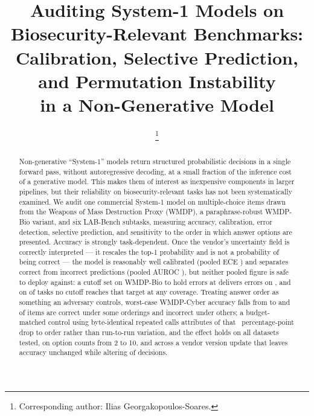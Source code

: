 \documentclass[conference,compsoc]{IEEEtran}
\begin{document}
\title{Auditing System-1 Models on Biosecurity-Relevant Benchmarks:\\
Calibration, Selective Prediction, and Permutation Instability\\
in a Non-Generative Model}

\author{%
\thanks{Corresponding author: Ilias Georgakopoulos-Soares.}
}

\maketitle

\begin{abstract}
Non-generative ``System-1'' models return structured probabilistic decisions in a single
forward pass, without autoregressive decoding, at a small fraction of the inference cost of
a generative model. This makes them of interest as inexpensive components in larger
pipelines, but their reliability on biosecurity-relevant tasks has not been systematically
examined. We audit one commercial System-1 model on \statNItems{} multiple-choice items
drawn from the Weapons of Mass Destruction Proxy (WMDP), a paraphrase-robust WMDP-Bio
variant, and six LAB-Bench subtasks, measuring accuracy, calibration, error detection,
selective prediction, and sensitivity to the order in which answer options are presented.
Accuracy is strongly task-dependent. Once the vendor's uncertainty field is correctly
interpreted --- it rescales the top-1 probability and is not a probability of being correct
--- the model is reasonably well calibrated (pooled ECE \statEcePmax{}) and separates
correct from incorrect predictions (pooled AUROC \statAurocPooled{}), but neither pooled
figure is safe to deploy against: a cutoff set on WMDP-Bio to hold errors at
\statThrTarget{} delivers \statThrBioWorst{} errors on \statThrBioWorstLabel{}, and on
\statThrNUnachievable{} of \statThrNDatasets{} tasks no cutoff reaches that target at any
coverage. Treating answer order as something an adversary controls, worst-case WMDP-Cyber
accuracy falls from \statAtkSingleCyber{} to \statAtkWorstRotCyber{} and
\statAtkSteerRotCyber{} of items are correct under some orderings and incorrect under
others; a budget-matched control using byte-identical repeated calls attributes
\statAtkOrderDropCyber{} of that \statAtkDropRotCyber{}~percentage-point drop to order
rather than run-to-run variation, and the effect holds on all
\statAtkNDatasets{} datasets tested, on option counts from 2 to 10, and across a vendor
version update that leaves accuracy unchanged while altering
\statVerDisagreeCyber{} of decisions.
\end{abstract}
\end{document}
